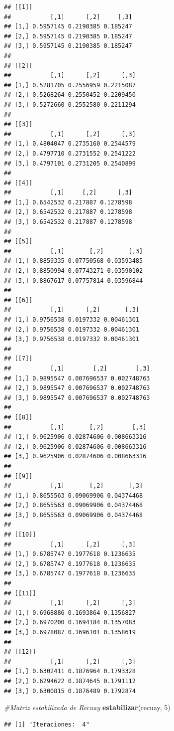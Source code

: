 \documentclass{article}
\newenvironment{Shaded}{\begin{snugshade}}{\end{snugshade}}
\newcommand{\CommentTok}[1]{\textcolor[rgb]{0.56,0.35,0.01}{\textit{#1}}}
\newcommand{\DecValTok}[1]{\textcolor[rgb]{0.00,0.00,0.81}{#1}}
\newcommand{\KeywordTok}[1]{\textcolor[rgb]{0.13,0.29,0.53}{\textbf{#1}}}
\newcommand{\NormalTok}[1]{#1}
\begin{document}
\begin{verbatim}
## [[1]]
##           [,1]      [,2]     [,3]
## [1,] 0.5957145 0.2190385 0.185247
## [2,] 0.5957145 0.2190385 0.185247
## [3,] 0.5957145 0.2190385 0.185247
## 
## [[2]]
##           [,1]      [,2]      [,3]
## [1,] 0.5281705 0.2556959 0.2215087
## [2,] 0.5268264 0.2550452 0.2209450
## [3,] 0.5272660 0.2552580 0.2211294
## 
## [[3]]
##           [,1]      [,2]      [,3]
## [1,] 0.4804047 0.2735160 0.2544579
## [2,] 0.4797710 0.2731552 0.2541222
## [3,] 0.4797101 0.2731205 0.2540899
## 
## [[4]]
##           [,1]     [,2]      [,3]
## [1,] 0.6542532 0.217887 0.1278598
## [2,] 0.6542532 0.217887 0.1278598
## [3,] 0.6542532 0.217887 0.1278598
## 
## [[5]]
##           [,1]       [,2]       [,3]
## [1,] 0.8859335 0.07750568 0.03593485
## [2,] 0.8850994 0.07743271 0.03590102
## [3,] 0.8867617 0.07757814 0.03596844
## 
## [[6]]
##           [,1]      [,2]       [,3]
## [1,] 0.9756538 0.0197332 0.00461301
## [2,] 0.9756538 0.0197332 0.00461301
## [3,] 0.9756538 0.0197332 0.00461301
## 
## [[7]]
##           [,1]        [,2]        [,3]
## [1,] 0.9895547 0.007696537 0.002748763
## [2,] 0.9895547 0.007696537 0.002748763
## [3,] 0.9895547 0.007696537 0.002748763
## 
## [[8]]
##           [,1]       [,2]        [,3]
## [1,] 0.9625906 0.02874606 0.008663316
## [2,] 0.9625906 0.02874606 0.008663316
## [3,] 0.9625906 0.02874606 0.008663316
## 
## [[9]]
##           [,1]       [,2]       [,3]
## [1,] 0.8655563 0.09069906 0.04374468
## [2,] 0.8655563 0.09069906 0.04374468
## [3,] 0.8655563 0.09069906 0.04374468
## 
## [[10]]
##           [,1]      [,2]      [,3]
## [1,] 0.6785747 0.1977618 0.1236635
## [2,] 0.6785747 0.1977618 0.1236635
## [3,] 0.6785747 0.1977618 0.1236635
## 
## [[11]]
##           [,1]      [,2]      [,3]
## [1,] 0.6968886 0.1693864 0.1356827
## [2,] 0.6970200 0.1694184 0.1357083
## [3,] 0.6978087 0.1696101 0.1358619
## 
## [[12]]
##           [,1]      [,2]      [,3]
## [1,] 0.6302411 0.1876964 0.1793328
## [2,] 0.6294622 0.1874645 0.1791112
## [3,] 0.6300815 0.1876489 0.1792874
\end{verbatim}

\begin{Shaded}
\begin{Highlighting}[]
\CommentTok{#Matriz estabilizada de Recuay}
\KeywordTok{estabilizar}\NormalTok{(recuay, }\DecValTok{5}\NormalTok{)}
\end{Highlighting}
\end{Shaded}

\begin{verbatim}
## [1] "Iteraciones:  4"
\end{verbatim}
\end{document}
